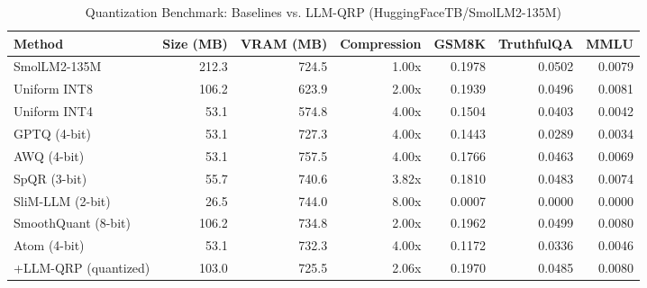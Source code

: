 \begin{table}[htbp]
  \centering
  \small
  \caption{Quantization Benchmark: Baselines vs. LLM-QRP (HuggingFaceTB/SmolLM2-135M)}
  \label{tab:benchmark}
  \begin{tabular}{lrrrrrr}
    \toprule
    \textbf{Method} & \textbf{Size (MB)} & \textbf{VRAM (MB)} & \textbf{Compression} & \textbf{GSM8K} & \textbf{TruthfulQA} & \textbf{MMLU} \\
    \midrule
    SmolLM2-135M & 212.3 & 724.5 & 1.00x & 0.1978 & 0.0502 & 0.0079 \\
    Uniform INT8 & 106.2 & 623.9 & 2.00x & 0.1939 & 0.0496 & 0.0081 \\
    Uniform INT4 & 53.1 & 574.8 & 4.00x & 0.1504 & 0.0403 & 0.0042 \\
    GPTQ (4-bit) & 53.1 & 727.3 & 4.00x & 0.1443 & 0.0289 & 0.0034 \\
    AWQ (4-bit) & 53.1 & 757.5 & 4.00x & 0.1766 & 0.0463 & 0.0069 \\
    SpQR (3-bit) & 55.7 & 740.6 & 3.82x & 0.1810 & 0.0483 & 0.0074 \\
    SliM-LLM (2-bit) & 26.5 & 744.0 & 8.00x & 0.0007 & 0.0000 & 0.0000 \\
    SmoothQuant (8-bit) & 106.2 & 734.8 & 2.00x & 0.1962 & 0.0499 & 0.0080 \\
    Atom (4-bit) & 53.1 & 732.3 & 4.00x & 0.1172 & 0.0336 & 0.0046 \\
    \midrule
    +LLM-QRP (quantized) & 103.0 & 725.5 & 2.06x & 0.1970 & 0.0485 & 0.0080 \\
    \bottomrule
  \end{tabular}
\end{table}
